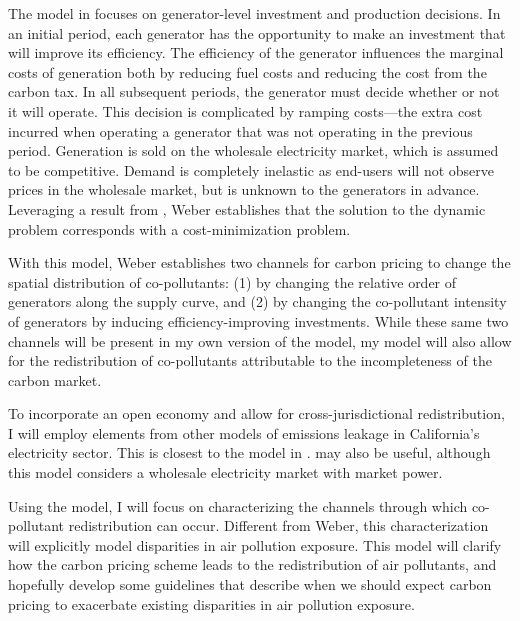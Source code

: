 \documentclass[11pt]{article}
\begin{document}
The model in \cite{weber2021dynamic} focuses on generator-level investment and production decisions. In an initial period, each generator has the opportunity to make an investment that will improve its efficiency. The efficiency of the generator influences the marginal costs of generation both by reducing fuel costs and reducing the cost from the carbon tax. In all subsequent periods, the generator must decide whether or not it will operate. This decision is complicated by ramping costs---the extra cost incurred when operating a generator that was not operating in the previous period. Generation is sold on the wholesale electricity market, which is assumed to be competitive. Demand is completely inelastic as end-users will not observe prices in the wholesale market, but is unknown to the generators in advance. Leveraging a result from \cite{cullen2015}, Weber establishes that the solution to the dynamic problem corresponds with a cost-minimization problem. 

With this model, Weber establishes two channels for carbon pricing to change the spatial distribution of co-pollutants: (1) by changing the relative order of generators along the supply curve, and (2) by changing the co-pollutant intensity of generators by inducing efficiency-improving investments. While these same two channels will be present in my own version of the model, my model will also allow for the redistribution of co-pollutants attributable to the incompleteness of the carbon market.

To incorporate an open economy and allow for cross-jurisdictional redistribution, I will employ elements from other models of emissions leakage in California's electricity sector. This is closest to the model in \cite{fowlie2021border}. \cite{fowlie2009incomplete} may also be useful, although this model considers a wholesale electricity market with market power. 

Using the model, I will focus on characterizing the channels through which co-pollutant redistribution can occur. Different from Weber, this characterization will explicitly model disparities in air pollution exposure. This model will clarify how the carbon pricing scheme leads to the redistribution of air pollutants, and hopefully develop some guidelines that describe when we should expect carbon pricing to exacerbate existing disparities in air pollution exposure. 
\end{document}
